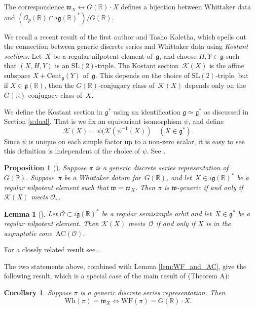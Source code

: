 \documentclass[10pt,leqno]{article}
\newtheorem{corollary}[equation]{Corollary}
\newtheorem{lemma}[equation]{Lemma}
\newtheorem{proposition}[equation]{Proposition}
\numberwithin{equation}{section}
\renewcommand{\O}{\mathcal O}
\newcommand{\R}{\mathbb R}
\newcommand{\K}{\mathcal K}
\newcommand{\g}{\mathfrak g}
\newcommand\inv{^{-1}}
\newcommand{\SL}{\text{SL}}
\newcommand{\w}{\mathfrak w}
\newcommand{\Wh}{\mathrm{Wh}}
\newcommand{\WF}{\mathrm{WF}}
\newcommand{\AC}{\mathrm{AC}}
\newcommand{\Op}{\O_p}
\newcommand{\Kostant}[1]{\mathcal{K}(#1)}
\begin{document}
The correspondence $\mathfrak{w}_{X} \leftrightarrow G(\R)\cdot X$ defines a bijection between Whittaker data and
$(\Op(\R)\cap i\g(\R)^*)/G(\R)$. 


We recall a recent result of the first author and Tasho Kaletha, which spells out the connection between generic discrete series and Whittaker data using  {\it Kostant sections}. Let~$X$ be a regular nilpotent element of~$\g$, and choose  $H, Y \in \g$ such that $(X,H,Y)$ is an  $\SL(2)$-triple. The Kostant section~$\Kostant{X}$ is the affine subspace $X + \mathrm{Cent}_{\g}(Y)$ of~$\g$. This depends on the choice of $\SL(2)$-triple, but if $X \in \g(\R)$, then the $G(\R)$-conjugacy class of~$\Kostant{X}$ depends only on the $G(\R)$-conjugacy class of~$X$.

We define the Kostant section in $\g^*$ using an identification $\g\simeq \g^*$ as discussed in Section \ref{s:dual}. That is we fix an equivariant isomorphism $\psi$, and define
$$
\K(X)=\psi(\K(\psi\inv(X))\quad (X\in \g^*).
$$
Since $\psi$ is unique on each simple factor up to a non-zero scalar, it is easy to see this definition is independent of the choice of $\psi$. See \cite[Section 3.2]{adams_kaletha}.

\begin{proposition}[]\label{JeffTasho_criterion}
  \label{p:Kostant}
Suppose $\pi$ is a generic discrete series representation of~$G(\R)$. Suppose~$\pi$ be a Whittaker datum for~$G(\R)$, and let~$X \in i\g(\R)^*$ be a regular nilpotent element such that $\w = \w_X$. 
Then $\pi$ is $\w$-generic if and only if $\Kostant{X}$ meets $\mathcal{O}_\pi$. 
\end{proposition}



\begin{lemma}[]
\label{lem:Kost_and_AC}
Let $\mathcal{O} \subset i\g(\R)^\ast$ be a regular semisimple orbit and  let~$X \in \g^\ast$ be a regular nilpotent element. Then $\Kostant{X}$ meets~$\mathcal{O}$ if and only if $X$ is in the asymptotic cone~$\AC(\mathcal{O})$. 
\end{lemma}

For a closely related result see \cite[Proposition 3.5]{fm}.

The two statements above, combined with Lemma \ref{lem:WF_and_AC}, give the following result,
which is a special case of the main result of \cite{matumoto} (Theorem A):
  
\begin{corollary}\label{cor:matumoto}
Suppose $\pi$ is a generic discrete series representation. Then
$$
\Wh(\pi)=\w_X\Leftrightarrow \WF(\pi)=G(\R)\cdot X.
$$
\end{corollary}
\end{document}
